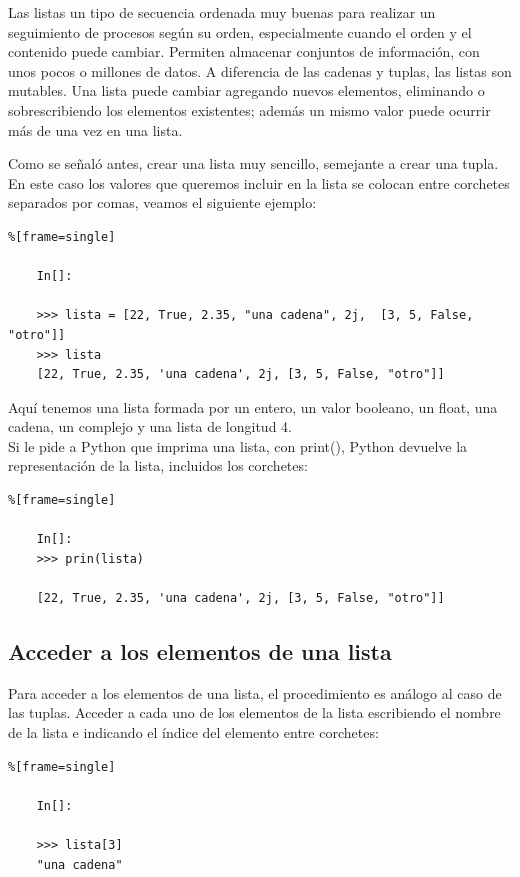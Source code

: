 Las listas un tipo de secuencia ordenada muy buenas para realizar un seguimiento de procesos según su orden, especialmente cuando el orden y el contenido puede cambiar. Permiten almacenar conjuntos de información, con
unos pocos  o millones de datos. A diferencia de las cadenas y tuplas, las listas son mutables. Una lista puede cambiar agregando nuevos elementos, eliminando o sobrescribiendo los elementos existentes; además  un mismo valor puede ocurrir más de una vez en una lista.



Como se señaló antes, crear una lista muy  sencillo, semejante a crear una tupla. En este caso  los valores que queremos incluir en la lista se colocan entre corchetes separados por comas, veamos el siguiente ejemplo:
\begin{lstlisting}%[frame=single]
	
	In[]:
	
	>>> lista = [22, True, 2.35, "una cadena", 2j,  [3, 5, False, "otro"]]
	>>> lista
	[22, True, 2.35, 'una cadena', 2j, [3, 5, False, "otro"]]
\end{lstlisting}

Aquí tenemos una lista formada por un entero, un valor booleano, un float, una cadena, un complejo y una lista de longitud 4.\\ 

Si le pide a Python que imprima una lista, con {\ttfamily print()}, Python devuelve la representación de la
lista, incluidos los corchetes:
\begin{lstlisting}%[frame=single]
	
	In[]:
	>>> prin(lista)
	
	[22, True, 2.35, 'una cadena', 2j, [3, 5, False, "otro"]]
\end{lstlisting}

\subsection{Acceder a los elementos de una lista}

Para acceder a los elementos de una lista,  el procedimiento es análogo al  caso  de las tuplas.  Acceder a cada uno de los elementos de la lista escribiendo el nombre de la lista e indicando el índice del elemento entre corchetes:

\begin{lstlisting}%[frame=single]
	
	In[]:
	
	>>> lista[3]
	"una cadena"
\end{lstlisting}

